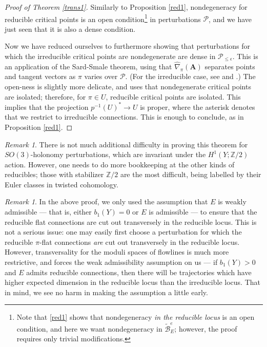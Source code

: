 \documentclass{memo-l}
\theoremstyle{definition}
\theoremstyle{remark}
\newtheorem{remark}[theorem]{Remark}
\numberwithin{section}{chapter}
\numberwithin{equation}{chapter}
\begin{document}
\begin{proof}[Proof of Theorem \ref{trans1}]
Similarly to Proposition \ref{red1}, nondegeneracy for reducible critical points is an open condition\footnote{Note that \ref{red1} shows that nondegeneracy \textit{in the reducible locus} is an open condition, and here we want nondegeneracy in $\widetilde{\mathcal B}^e_E$; however, the proof requires only trivial modifications.} in perturbations $\mathcal P$, and we have just seen that it is also a dense condition. 

Now we have reduced ourselves to furthermore showing that perturbations for which the irreducible critical points are nondegenerate are dense in $\mathcal P_{\leq \epsilon}$. This is an application of the Sard-Smale theorem, using that $\widehat{\nabla}_\pi(\mathbf{A})$ separates points and tangent vectors as $\pi$ varies over $\mathcal P$. (For the irreducible case, see \cite{Fl1} and \cite[Section~5.5.1]{Don}.) The open-ness is slightly more delicate, and uses that nondegenerate critical points are isolated; therefore, for $\pi \in U$, reducible critical points are isolated. This implies that the projection $p^{-1}(U)^* \to U$ is proper, where the asterisk denotes that we restrict to irreducible connections. This is enough to conclude, as in Proposition \ref{red1}.
\end{proof}

\begin{remark}There is not much additional difficulty in proving this theorem for $SO(3)$-holonomy perturbations, which are invariant under the $H^1(Y;\mathbb Z/2)$ action. However, one needs to do more bookkeeping at the other kinds of reducibles; those with stabilizer $\mathbb Z/2$ are the most difficult, being labelled by their Euler classes in twisted cohomology. 
\end{remark}

\begin{remark}In the above proof, we only used the assumption that $E$ is weakly admissible --- that is, either $b_1(Y) = 0$ or $E$ is admissible --- to ensure that the reducible flat connections are cut out transversely in the reducible locus. This is not a serious issue: one may easily first choose a perturbation for which the reducible $\pi$-flat connections \textit{are} cut out transversely in the reducible locus. However, transversality for the moduli spaces of flowlines is much more restrictive, and forces the weak admissibility assumption on us --- if $b_1(Y) > 0$ and $E$ admits reducible connections, then there will be trajectories which have higher expected dimension in the reducible locus than the irreducible locus. That in mind, we see no harm in making the assumption a little early.
\end{remark}
\end{document}
